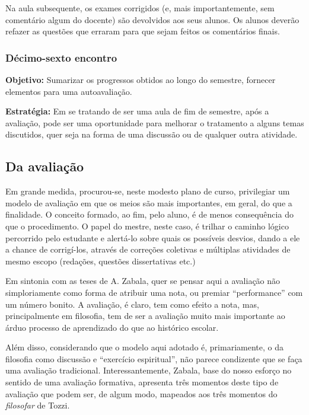 \documentclass[12pt,a4paper]{article}
\begin{document}
	Na aula subsequente, os exames corrigidos (e, mais importantemente,  
	sem comentário algum do docente) são devolvidos aos seus alunos. Os 
	alunos deverão refazer as questões que erraram para que sejam 
	feitos os comentários finais. 
	
	\subsubsection{Décimo-sexto encontro}
	
	\textbf{Objetivo:} Sumarizar os progressos obtidos ao longo do 
	semestre, fornecer elementos para uma autoavaliação. 

	\textbf{Estratégia:}
	Em se tratando de ser uma aula de fim de semestre, após a avaliação, 
	pode ser uma oportunidade para melhorar o tratamento a alguns temas 
	discutidos, quer seja na forma de uma discussão ou de qualquer outra 
	atividade. 



	\newpage
	
	\subsection{Da avaliação}

	Em grande medida, procurou-se, neste modesto plano de curso, 
	privilegiar um modelo de avaliação em que os meios são mais 
	importantes, em geral, do que a finalidade. O conceito formado, 
	ao fim, pelo aluno, é de menos consequência do que o procedimento. 
	O papel do mestre, neste caso, é trilhar o caminho lógico percorrido 
	pelo estudante e alertá-lo sobre quais os possíveis desvios, dando 
	a ele a chance de corrigí-los, através de correções coletivas e 
	múltiplas atividades de mesmo escopo (redações, questões dissertativas
	etc.) 

	Em sintonia com as teses de A. Zabala, quer se pensar aqui a 
	avaliação não simploriamente como forma de atribuir uma nota, ou 
	premiar “performance” com um número bonito. A avaliação, é claro, 
	tem como efeito a nota, mas, principalmente em filosofia, tem 
	de ser a avaliação muito mais importante ao árduo processo de 
	aprendizado do que ao histórico escolar. 

	Além disso, considerando que o modelo aqui adotado é, primariamente, 
	o da filosofia como discussão e “exercício espiritual”, não parece 
	condizente que se faça uma avaliação tradicional. Interessantemente, 
	Zabala, base do nosso esforço no sentido de uma avaliação formativa, 
	apresenta três momentos deste tipo de avaliação que podem ser, de 
	algum modo, mapeados aos três momentos do \emph{filosofar} de Tozzi. 
\end{document}
